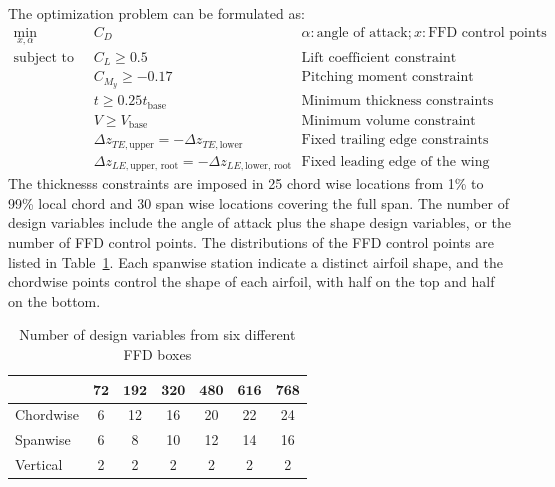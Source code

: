 The optimization problem can be formulated as: 
\begin{equation*}
  \begin{alignedat}{2}
    \underset{x, \alpha}{\text{min}} \quad & C_D && \alpha: \text{angle of attack}; x:\text{FFD control points}   \\
    \text{subject to} \quad & C_L \geq 0.5  && \text{Lift coefficient constraint}   \\
      & C_{M_y} \geq -0.17          && \text{Pitching moment constraint}   \\
      & t \geq 0.25 t_{\text{base}} && \text{Minimum thickness constraints}   \\
      & V \geq V_{\text{base}} && \text{Minimum volume constraint}   \\
      & \Delta z_{TE, \text{upper}} = -\Delta z_{TE, \text{lower}}  && \text{Fixed trailing edge constraints}   \\
      & \Delta z_{LE, \text{upper, root}} = -\Delta z_{LE, \text{lower, root}} && \text{Fixed leading edge of the wing root}  
  \end{alignedat}
\end{equation*}
The thicknesss constraints are imposed in 25 chord wise locations from 1\% to 99\% local chord and 30 span wise locations covering the full span.  The number of design variables include the angle of attack plus the shape design variables, or the number of FFD control points. The distributions of the FFD control points are listed in Table~\ref{tab:ffd_sizes}. Each spanwise station indicate a distinct airfoil shape, and the chordwise points control the shape of each airfoil, with half on the top and half on the bottom.  
 
\begin{table}[tbp]
  \begin{center}
    \caption{Number of design variables from six different FFD boxes
    \label{tab:ffd_sizes}}
  \begin{tabular}{ l c c c c c c}
         & $\mathbf{72}$  & $\mathbf{192}$ & $\mathbf{320}$
    & $\mathbf{480}$  &  $\mathbf{616}$  &  $\mathbf{768}$   \\
    \hline
    Chordwise  &   6 & 12  & 16  & 20 & 22 & 24 \\ 
    Spanwise &   6 & 8 & 10  & 12 & 14 & 16 \\  
    Vertical  &   2 & 2 & 2 & 2  & 2 & 2
  \end{tabular}
  \end{center}
\end{table}

